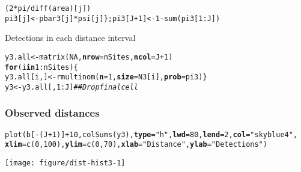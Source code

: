 \documentclass[color=usenames,dvipsnames]{beamer}\usepackage[]{graphicx}\usepackage[]{xcolor}
\makeatletter
\newcommand{\hlnum}[1]{\textcolor[rgb]{0.69,0.494,0}{#1}}%
\newcommand{\hlstr}[1]{\textcolor[rgb]{0.749,0.012,0.012}{#1}}%
\newcommand{\hlcom}[1]{\textcolor[rgb]{0.514,0.506,0.514}{\textit{#1}}}%
\newcommand{\hlopt}[1]{\textcolor[rgb]{0,0,0}{#1}}%
\newcommand{\hlstd}[1]{\textcolor[rgb]{0,0,0}{#1}}%
\newcommand{\hlkwa}[1]{\textcolor[rgb]{0,0,0}{\textbf{#1}}}%
\newcommand{\hlkwb}[1]{\textcolor[rgb]{0,0.341,0.682}{#1}}%
\newcommand{\hlkwc}[1]{\textcolor[rgb]{0,0,0}{\textbf{#1}}}%
\newcommand{\hlkwd}[1]{\textcolor[rgb]{0.004,0.004,0.506}{#1}}%
\newenvironment{kframe}{%
 \def\at@end@of@kframe{}%
 \ifinner\ifhmode%
  \def\at@end@of@kframe{\end{minipage}}%
  \begin{minipage}{\columnwidth}%
 \fi\fi%
 \def\FrameCommand##1{\hskip\@totalleftmargin \hskip-\fboxsep
 \colorbox{shadecolor}{##1}\hskip-\fboxsep
     \hskip-\linewidth \hskip-\@totalleftmargin \hskip\columnwidth}%
 \MakeFramed {\advance\hsize-\width
   \@totalleftmargin\z@ \linewidth\hsize
   \@setminipage}}%
 {\par\unskip\endMakeFramed%
 \at@end@of@kframe}
\newenvironment{knitrout}{}{} %
\makeatother
\begin{document}
\begin{frame}[fragile]
\begin{knitrout}
\begin{kframe}
\begin{alltt}
                          \hlstd{(}\hlnum{2}\hlopt{*}\hlstd{pi}\hlopt{/}\hlkwd{diff}\hlstd{(area)[j])}
    \hlstd{pi3[j]} \hlkwb{<-} \hlstd{pbar3[j]}\hlopt{*}\hlstd{psi[j] \}; pi3[J}\hlopt{+}\hlnum{1}\hlstd{]} \hlkwb{<-} \hlnum{1}\hlopt{-}\hlkwd{sum}\hlstd{(pi3[}\hlnum{1}\hlopt{:}\hlstd{J])}
\end{alltt}
\end{kframe}
\end{knitrout}
  \pause
  \vfill
  Detections in each distance interval
  \vspace{-6pt}
\begin{knitrout}\scriptsize
{}\color{fgcolor}\begin{kframe}
\begin{alltt}
\hlstd{y3.all} \hlkwb{<-} \hlkwd{matrix}\hlstd{(}\hlnum{NA}\hlstd{,} \hlkwc{nrow}\hlstd{=nSites,} \hlkwc{ncol}\hlstd{=J}\hlopt{+}\hlnum{1}\hlstd{)}
\hlkwa{for}\hlstd{(i} \hlkwa{in} \hlnum{1}\hlopt{:}\hlstd{nSites) \{}
    \hlstd{y3.all[i,]} \hlkwb{<-} \hlkwd{rmultinom}\hlstd{(}\hlkwc{n}\hlstd{=}\hlnum{1}\hlstd{,} \hlkwc{size}\hlstd{=N3[i],} \hlkwc{prob}\hlstd{=pi3)    \}}
\hlstd{y3} \hlkwb{<-} \hlstd{y3.all[,}\hlnum{1}\hlopt{:}\hlstd{J]}  \hlcom{## Drop final cell}
\end{alltt}
\end{kframe}
\end{knitrout}
\end{frame}



\begin{frame}[fragile]
  \frametitle{Observed distances}
  \centering
\begin{knitrout}\scriptsize
{}\color{fgcolor}\begin{kframe}
\begin{alltt}
\hlkwd{plot}\hlstd{(b[}\hlopt{-}\hlstd{(J}\hlopt{+}\hlnum{1}\hlstd{)]}\hlopt{+}\hlnum{10}\hlstd{,} \hlkwd{colSums}\hlstd{(y3),} \hlkwc{type}\hlstd{=}\hlstr{"h"}\hlstd{,} \hlkwc{lwd}\hlstd{=}\hlnum{80}\hlstd{,} \hlkwc{lend}\hlstd{=}\hlnum{2}\hlstd{,} \hlkwc{col}\hlstd{=}\hlstr{"skyblue4"}\hlstd{,}
     \hlkwc{xlim}\hlstd{=}\hlkwd{c}\hlstd{(}\hlnum{0}\hlstd{,}\hlnum{100}\hlstd{),} \hlkwc{ylim}\hlstd{=}\hlkwd{c}\hlstd{(}\hlnum{0}\hlstd{,} \hlnum{70}\hlstd{),} \hlkwc{xlab}\hlstd{=}\hlstr{"Distance"}\hlstd{,} \hlkwc{ylab}\hlstd{=}\hlstr{"Detections"}\hlstd{)}
\end{alltt}
\end{kframe}
\texttt{[image: figure/dist-hist3-1]} 
\end{knitrout}
\end{frame}
\end{document}

